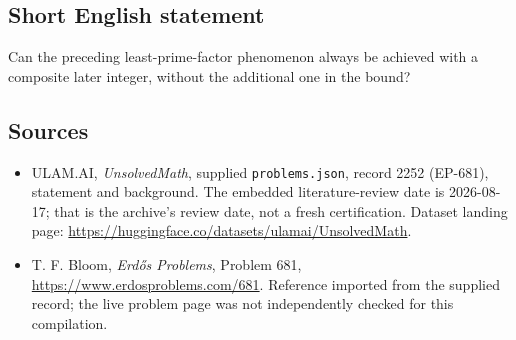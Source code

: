 \documentclass[11pt,a4paper]{article}
\begin{document}
\subsection{Short English statement}

Can the preceding least-prime-factor phenomenon always be achieved with a composite later integer, without the additional one in the bound?

\subsection{Sources}

{\small

\begin{itemize}

\item[\hypertarget{source:2252:1}{S1}] ULAM.AI, \emph{UnsolvedMath}, supplied \texttt{problems.json}, record 2252 (EP-681), statement and background. The embedded literature-review date is 2026-08-17; that is the archive’s review date, not a fresh certification. Dataset landing page: \url{https://huggingface.co/datasets/ulamai/UnsolvedMath}.

\item[\hypertarget{source:2252:2}{S2}] T. F. Bloom, \emph{Erdős Problems}, Problem 681, \url{https://www.erdosproblems.com/681}. Reference imported from the supplied record; the live problem page was not independently checked for this compilation.

\end{itemize}

}

\label{end:2252}
\end{document}
